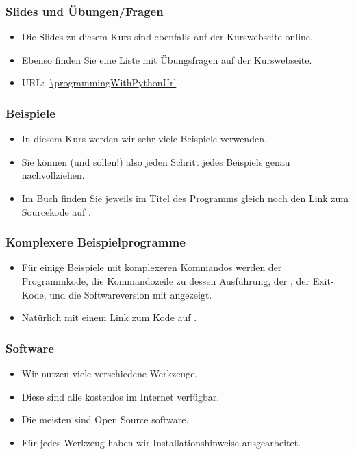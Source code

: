\documentclass[aspectratio=169,mathserif,notheorems]{beamer}%
\begin{document}
%
\begin{frame}%
\frametitle{Slides und Übungen/Fragen}%
\begin{itemize}%
\item Die Slides zu diesem Kurs sind ebenfalls auf der Kurswebseite online.%
\item<2-> Ebenso finden Sie eine Liste mit Übungsfragen auf der Kurswebseite.%
\item<3-> URL:~\expandafter\url{\programmingWithPythonUrl}%
\end{itemize}%
\end{frame}%
%
\begin{frame}[fragile,t]
\frametitle{Beispiele}%
\begin{itemize}%
\item In diesem Kurs werden wir sehr viele Beispiele verwenden.
\item<2-> Sie können (und sollen!) also jeden Schritt jedes Beispiels genau nachvollziehen.%
\item<3-> Im Buch finden Sie jeweils im Titel des Programms gleich noch den Link zum Sourcekode auf \github.%
\end{itemize}%
%
%
\end{frame}
%
\begin{frame}%
\frametitle{Komplexere Beispielprogramme}%
\parbox{0.435\linewidth}{%
\begin{itemize}%
\item Für einige Beispiele mit komplexeren Kommandos werden der Programmkode, die Kommandozeile zu dessen Ausführung, der , der Exit-Kode, und die Softwareversion mit angezeigt.%
\item<2-> Natürlich mit einem Link zum Kode auf \github.%
\end{itemize}%
}%
%
\end{frame}%
%
\begin{frame}%
\frametitle{Software}%
\begin{itemize}%
\item Wir nutzen viele verschiedene Werkzeuge.%
\item<2-> Diese sind alle kostenlos im Internet verfügbar.%
\item<3-> Die meisten sind Open Source software.%
\item<4-> Für jedes Werkzeug haben wir Installationshinweise ausgearbeitet.%
\end{itemize}%
\end{frame}%
\end{document}
